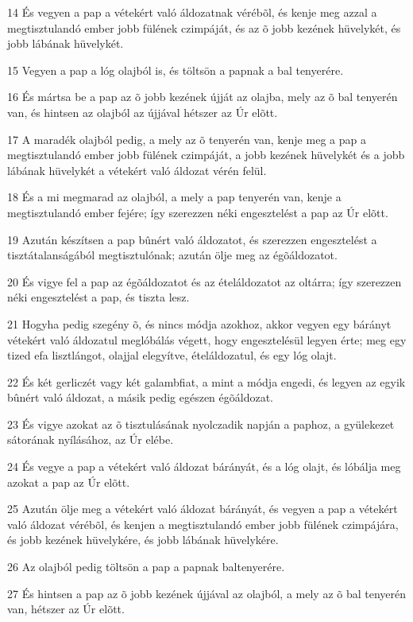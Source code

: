 \par 14 És vegyen a pap a vétekért való áldozatnak vérébõl, és kenje meg azzal a megtisztulandó ember jobb fülének czimpáját, és az õ jobb kezének hüvelykét, és jobb lábának hüvelykét.
\par 15 Vegyen a pap a lóg olajból is, és töltsön a papnak a bal tenyerére.
\par 16 És mártsa be a pap az õ jobb kezének újját az olajba, mely az õ bal tenyerén van, és hintsen az olajból az újjával hétszer az Úr elõtt.
\par 17 A maradék olajból pedig, a mely az õ tenyerén van, kenje meg a pap a megtisztulandó ember jobb fülének czimpáját, a jobb kezének hüvelykét és a jobb lábának hüvelykét a vétekért való áldozat vérén felül.
\par 18 És a mi megmarad az olajból, a mely a pap tenyerén van, kenje a megtisztulandó ember fejére; így szerezzen néki engesztelést a pap az Úr elõtt.
\par 19 Azután készítsen a pap bûnért való áldozatot, és szerezzen engesztelést a tisztátalanságából megtisztulónak; azután ölje meg az égõáldozatot.
\par 20 És vigye fel a pap az égõáldozatot és az ételáldozatot az oltárra; így szerezzen néki engesztelést a pap, és tiszta lesz.
\par 21 Hogyha pedig szegény õ, és nincs módja azokhoz, akkor vegyen egy bárányt vétekért való áldozatul meglóbálás végett, hogy engesztelésül legyen érte; meg egy tized efa lisztlángot, olajjal elegyítve, ételáldozatul, és egy lóg olajt.
\par 22 És két gerliczét vagy két galambfiat, a mint a módja engedi, és legyen az egyik bûnért való áldozat, a másik pedig egészen égõáldozat.
\par 23 És vigye azokat az õ tisztulásának nyolczadik napján a paphoz, a gyülekezet sátorának nyílásához, az Úr elébe.
\par 24 És vegye a pap a vétekért való áldozat bárányát, és a lóg olajt, és lóbálja meg azokat a pap az Úr elõtt.
\par 25 Azután ölje meg a vétekért való áldozat bárányát, és vegyen a pap a vétekért való áldozat vérébõl, és kenjen a megtisztulandó ember jobb fülének czimpájára, és jobb kezének hüvelykére, és jobb lábának hüvelykére.
\par 26 Az olajból pedig töltsön a pap a papnak baltenyerére.
\par 27 És hintsen a pap az õ jobb kezének újjával az olajból, a mely az õ bal tenyerén van, hétszer az Úr elõtt.
